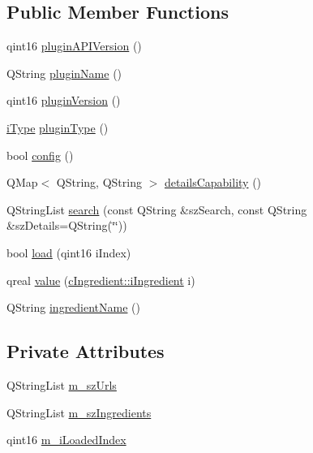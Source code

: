 \subsection*{Public Member Functions}
\begin{DoxyCompactItemize}
\item 
qint16 \hyperlink{classc_ernaehrung_plugin_a44195e21ed764afb56bbcb4d64af1f3a}{plugin\+A\+P\+I\+Version} ()
\item 
Q\+String \hyperlink{classc_ernaehrung_plugin_a67ea2bef7e9d68fe3705baff59c9fec5}{plugin\+Name} ()
\item 
qint16 \hyperlink{classc_ernaehrung_plugin_a9f94e9684b541b55e67b87bff7a0a028}{plugin\+Version} ()
\item 
\hyperlink{classc_interface_a41462a3131755963add9ba3026e7d31a}{i\+Type} \hyperlink{classc_ernaehrung_plugin_aadc57be2d4fa422a9cadcbf647926700}{plugin\+Type} ()
\item 
bool \hyperlink{classc_ernaehrung_plugin_acbadba8cb20826f22cce60af8f4be98f}{config} ()
\item 
Q\+Map$<$ Q\+String, Q\+String $>$ \hyperlink{classc_ernaehrung_plugin_a9fef4cc5e1c59999833ffb4493cfae3e}{details\+Capability} ()
\item 
Q\+String\+List \hyperlink{classc_ernaehrung_plugin_aec19c86cca48415dbef841bc5b3cc15d}{search} (const Q\+String \&sz\+Search, const Q\+String \&sz\+Details=Q\+String(\char`\"{}\char`\"{}))
\item 
bool \hyperlink{classc_ernaehrung_plugin_a2d688c0a56bed5b8f233dd5890a96a3d}{load} (qint16 i\+Index)
\item 
qreal \hyperlink{classc_ernaehrung_plugin_a8b4bb34247562c26687bb33e6369eb25}{value} (\hyperlink{classc_ingredient_acf023723841ec66cd6368a25e3174a28}{c\+Ingredient\+::i\+Ingredient} i)
\item 
Q\+String \hyperlink{classc_ernaehrung_plugin_a24c04c0b98fb4186e5b5b012662b39ed}{ingredient\+Name} ()
\end{DoxyCompactItemize}
\subsection*{Private Attributes}
\begin{DoxyCompactItemize}
\item 
Q\+String\+List \hyperlink{classc_ernaehrung_plugin_a58692dcfff3d8f9da462b90fbf12db06}{m\+\_\+sz\+Urls}
\item 
Q\+String\+List \hyperlink{classc_ernaehrung_plugin_aa586d90efc11b68dce605fdf1a45910d}{m\+\_\+sz\+Ingredients}
\item 
qint16 \hyperlink{classc_ernaehrung_plugin_a947339aef16691c4165c7eb1869d3b7e}{m\+\_\+i\+Loaded\+Index}
\end{DoxyCompactItemize}
